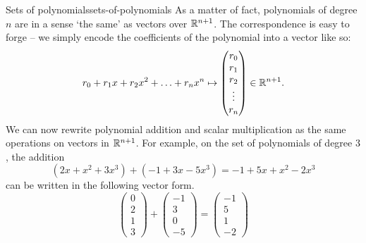 \begin{example}{Sets of polynomials}{sets-of-polynomials}
 As a matter of fact, polynomials of degree $n$ are in a sense `the same' as
 vectors over $\mathbb{R}^{n+1}$. The correspondence is easy to forge -- we simply
 encode the coefficients of the polynomial into a vector like so:
 \[
  r_0 + r_1x + r_2x^2 + \ldots + r_nx^{n} \mapsto 
  \begin{pmatrix}
   r_0\\
   r_1\\
   r_2\\
   \vdots\\
   r_n
  \end{pmatrix} \in \mathbb{R}^{n+1}.
 \]
 We can now rewrite polynomial addition and scalar multiplication as the same
 operations on vectors in $\mathbb{R}^{n+1}$. For example, on the set of polynomials of
 degree $3$, the addition
 \[
  (2x + x^2 + 3x^3) + (-1 + 3x - 5x^3) = -1 + 5x + x^2 - 2x^3
 \]
 can be written in the following vector form.
 \[
  \begin{pmatrix}
   0\\
   2\\
   1\\
   3
  \end{pmatrix}
  + 
  \begin{pmatrix}
   -1\\
   3\\
   0\\
   -5
  \end{pmatrix}
  = 
  \begin{pmatrix}
   -1\\
   5\\
   1\\
   -2
  \end{pmatrix}
 \]
\end{example}

